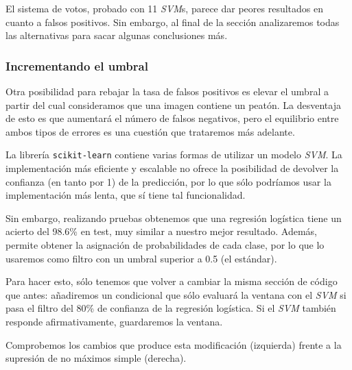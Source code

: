 \documentclass[11pt,a4paper]{article}
\begin{document}
                \par
                El sistema de votos, probado con 11 \textit{SVM}s, parece dar peores resultados en cuanto a falsos positivos. Sin embargo, al final de la sección analizaremos todas las alternativas para sacar algunas conclusiones más.

            \subsubsection{Incrementando el umbral}

                \par
                Otra posibilidad para rebajar la tasa de falsos positivos es elevar el umbral a partir del cual consideramos que una imagen contiene un peatón. La desventaja de esto es que aumentará el número de falsos negativos, pero el equilibrio entre ambos tipos de errores es una cuestión que trataremos más adelante.

                \par
                La librería \texttt{scikit-learn} contiene varias formas de utilizar un modelo \textit{SVM}. La implementación más eficiente y escalable no ofrece la posibilidad de devolver la confianza (en tanto por 1) de la predicción, por lo que sólo podríamos usar la implementación más lenta, que sí tiene tal funcionalidad.

                \par
                Sin embargo, realizando pruebas obtenemos que una regresión logística tiene un acierto del 98.6\% en test, muy similar a nuestro mejor resultado. Además, permite obtener la asignación de probabilidades de cada clase, por lo que lo usaremos como filtro con un umbral superior a 0.5 (el estándar).

                \par
                Para hacer esto, sólo tenemos que volver a cambiar la misma sección de código que antes: añadiremos un condicional que sólo evaluará la ventana con el \textit{SVM} si pasa el filtro del 80\% de confianza de la regresión logística. Si el \textit{SVM} también responde afirmativamente, guardaremos la ventana.

\newpage


                \par
                Comprobemos los cambios que produce esta modificación (izquierda) frente a la supresión de no máximos simple (derecha).
\end{document}
